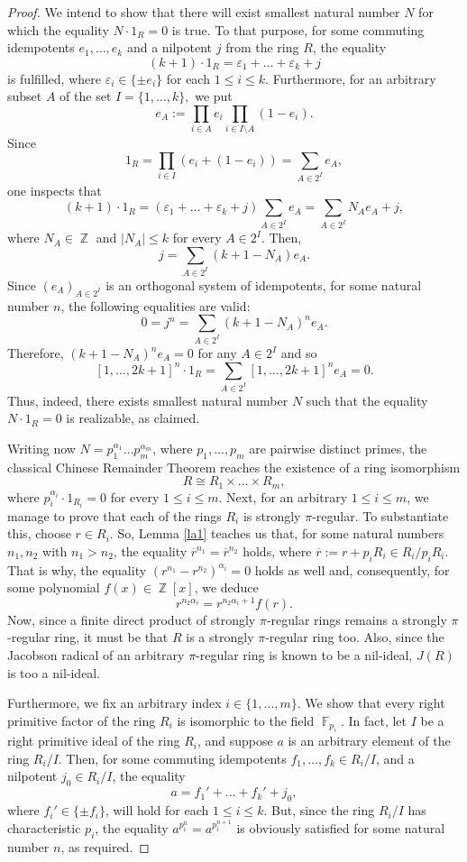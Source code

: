 \documentclass{amsart}
\DeclareMathOperator{\Z}{\mathbb{Z}}
\DeclareMathOperator{\F}{\mathbb{F}}
\theoremstyle{definition}
\theoremstyle{remark}
\numberwithin{equation}{section}
\begin{document}
\begin{proof}
We intend to show that there will exist smallest natural number $N$ for which the equality $N\cdot 1_R=0$ is true. To that purpose, for some commuting idempotents $e_1, \ldots, e_{k}$ and a nilpotent $j$ from the ring $R$, the equality $$(k+1)\cdot 1_R=\varepsilon_1+\ldots+\varepsilon_k+j$$ is fulfilled, where $\varepsilon_i\in \{\pm e_i\}$ for each $1\leq i\leq k$. Furthermore, for an arbitrary subset $A$ of the set $I=\{1,\ldots, k\},$ we put $$e_A:=\prod_{i\in A}e_i \prod_{i\in I \setminus A}(1-e_i).$$ Since
$$
1_R=\prod_{i\in I}(e_i+(1-e_i))=\sum_{A\in 2^I}e_A,
$$
one inspects that
$$
(k+1)\cdot 1_R=(\varepsilon_1+\ldots+\varepsilon_k+j)\sum_{A\in 2^I}e_A=\sum_{A\in 2^I}N_A e_A+j,
$$
where $N_A\in \Z$ and $\mid N_A\mid\leq k$ for every $A\in 2^I.$ Then,
$$
j=\sum_{A\in 2^I}(k+1-N_A ) e_A.
$$
Since $(e_A)_{A\in 2^I}$ is an orthogonal system of idempotents, for some natural number $n$, the following equalities are valid:
$$
0=j^n=\sum_{A\in 2^I}(k+1-N_A )^ne_A.
$$
Therefore, $(k+1-N_A )^ne_A=0$ for any $A\in 2^I$ and so
$$[1,\ldots, 2k+1]^n\cdot 1_R=\sum_{A\in 2^I}[1,\ldots, 2k+1]^ne_A=0.$$ Thus, indeed, there exists smallest natural number $N$ such that the equality $N\cdot 1_R=0$ is realizable, as claimed.

Writing now $N=p_1^{\alpha_1}\ldots p_m^{\alpha_m}$, where $p_1,\ldots, p_m$ are pairwise distinct primes, the classical Chinese Remainder Theorem reaches the existence of a ring isomorphism $$R\cong R_1\times \ldots\times R_m,$$ where $p_i^{\alpha_i}\cdot 1_{R_i}=0$ for every $1\leq i\leq m$. Next, for an arbitrary $1\leq i\leq m$, we manage to prove that each of the rings $R_i$ is strongly $\pi$-regular. To substantiate this, choose $r\in R_i$. So, Lemma \ref{la1} teaches us that, for some natural numbers $n_1, n_2$ with $n_1>n_2$, the equality $\overline{r}^{n_1}=\overline{r}^{n_2}$ holds, where $\overline{r}:=r+p_iR_i\in R_i/p_iR_i$. That is why, the equality $(r^{n_1}-r^{n_2})^{\alpha_i}=0$ holds as well and, consequently, for some polynomial $f(x)\in \Z[x]$, we deduce $$r^{n_2 \alpha_i}=r^{n_2 \alpha_i+1}f(r).$$ Now, since a finite direct product of strongly $\pi$-regular rings remains a strongly $\pi$-regular ring, it must be that $R$ is a strongly $\pi$-regular ring too. Also, since the Jacobson radical of an arbitrary $\pi$-regular ring is known to be a nil-ideal, $J(R)$ is too a nil-ideal.

Furthermore, we fix an arbitrary index $i\in \{1,\ldots, m\}$. We show that every right primitive factor of the ring $R_i$ is isomorphic to the field $\F_{p_i}$. In fact, let $I$ be a right primitive ideal of the ring $R_{i}$, and suppose $a$ is an arbitrary element of the ring $R_i/I$. Then, for some commuting idempotents $f_1, \ldots, f_{k}\in R_i/I$, and a nilpotent $j_0\in R_i/I$, the equality $$a=f_1'+\ldots+f_k'+j_0,$$ where $f_i'\in \{\pm f_i\}$, will hold for each $1\leq i\leq k$. But, since the ring $R_i/I$ has characteristic $p_i$, the equality $a^{p_i^n}=a^{p_i^{n+1}}$ is obviously satisfied for some natural number $n$, as required.


\end{proof}
\end{document}
